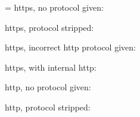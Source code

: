 \documentclass{ltugboat}
\begin{document}
\parskip=\baselineskip
https, no protocol given: 

https, protocol stripped: 

https, incorrect http protocol given: 

https, with internal http: 

http, no protocol given: 

http, protocol stripped: 

\loggingall
\end{document}
